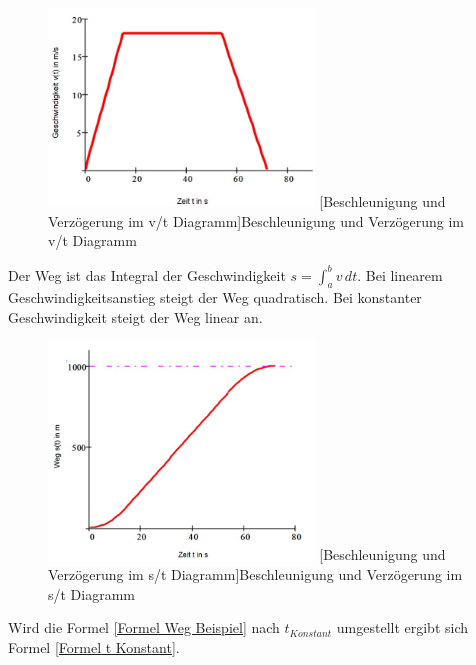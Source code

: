 \documentclass[10pt,a4paper,oneside,abstracton]{scrartcl}
\begin{document}
\begin{figure}
\begin{center}
	\includegraphics[width=200pt]{./Bilder/Geschwindigkeit.png}
	[Beschleunigung und Verzögerung im v/t Diagramm]{Beschleunigung und Verzögerung im v/t Diagramm \label{v/t Diagramm}} 
	\cite{Uebung1}
\end{center}
\end{figure}
Der Weg ist das Integral der Geschwindigkeit $ s = $\(\int_{a}^{b} v \,dt\). Bei linearem Geschwindigkeitsanstieg steigt der Weg quadratisch. 
Bei konstanter Geschwindigkeit steigt der Weg linear an. 
\begin{figure}
	\begin{center}
		\includegraphics[width=200pt]{./Bilder/weg.png}
		[Beschleunigung und Verzögerung im s/t Diagramm]{Beschleunigung und Verzögerung im s/t Diagramm \label{s/t Diagramm} }
		\cite{Uebung1}
	\end{center}

\end{figure}


Wird die Formel \ref*{Formel Weg Beispiel} nach $t_{Konstant} $ umgestellt ergibt sich Formel \ref*{Formel t Konstant}.
\end{document}
